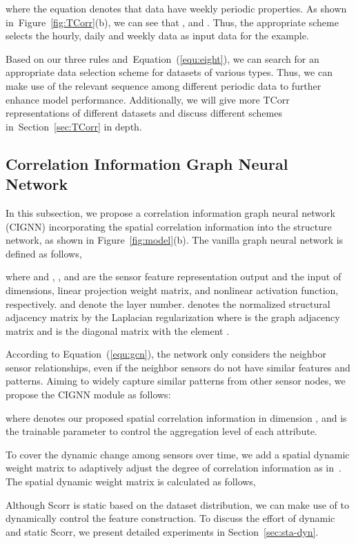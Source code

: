 \documentclass[sn-mathphys,iicol]{sn-jnl}
\newcommand\figref[1]{Figure~\ref{#1}}
\newcommand\secref[1]{Section~\ref{#1}}
\newcommand\equref[1]{Equation~(\ref{#1})}
\theoremstyle{thmstyleone}\newtheorem{theorem}{Theorem}\newtheorem{proposition}[theorem]{Proposition}
\theoremstyle{thmstyletwo}\newtheorem{example}{Example}\newtheorem{remark}{Remark}
\theoremstyle{thmstylethree}\newtheorem{definition}{Definition}
\begin{document}
where the equation  denotes that data have weekly periodic properties. 
As shown in~\figref{fig:TCorr}(b), we can see that ,  and . Thus, the appropriate scheme selects the hourly, daily and weekly data as input data for the example.

Based on our three rules and~\equref{equ:eight}, we can search for an appropriate data selection scheme for datasets of various types. Thus, we can make use of the relevant sequence among different periodic data to further enhance model performance. Additionally, we will give more TCorr representations of different datasets and discuss different schemes in~\secref{sec:TCorr} in depth.

\subsection{Correlation Information Graph Neural Network}
In this subsection, we propose a correlation information graph neural network (CIGNN) incorporating the spatial correlation information into the structure network, as shown in \figref{fig:model}(b). The vanilla graph neural network is defined as follows,

where  and , , and  are the sensor feature representation output and the input of  dimensions, linear projection weight matrix, and nonlinear activation function, respectively.
 and  denote the layer number.
 denotes the normalized structural adjacency matrix by the Laplacian regularization 
where  is the graph adjacency matrix and  is the diagonal matrix with the  element .

According to \equref{equ:gcn}, the network only considers the neighbor sensor relationships, even if the neighbor sensors do not have similar features and patterns. Aiming to widely capture similar patterns from other sensor nodes, we propose the CIGNN module as follows: 

where  denotes our proposed spatial correlation information in dimension , and  is the trainable parameter to control the aggregation level of each attribute. 

To cover the dynamic change among sensors over time, we add a spatial dynamic weight matrix  to adaptively adjust the degree of correlation information as in~\cite{Guo.2021}. The spatial dynamic weight matrix is calculated as follows,

Although Scorr is static based on the dataset distribution, we can make use of  to dynamically control the feature construction. To discuss the effort of dynamic and static Scorr, we present detailed experiments in \secref{sec:sta-dyn}.
\end{document}
